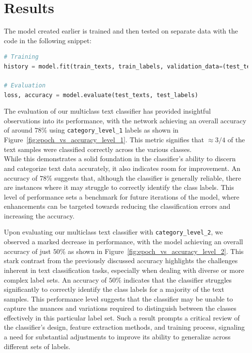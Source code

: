 \section{Results}
The model created earlier is trained and then tested on separate data with the code in the following snippet:
\begin{lstlisting}[language=Python]
# Training
history = model.fit(train_texts, train_labels, validation_data=(test_texts, test_labels), epochs=epochs, batch_size=batch_size, use_multiprocessing=True)

# Evaluation
loss, accuracy = model.evaluate(test_texts, test_labels)
\end{lstlisting}

The evaluation of our multiclass text classifier has provided insightful observations into its performance, with the network achieving an overall accuracy of around $78\%$ using \verb|category_level_1| labels as shown in Figure~\ref{fig:epoch_vs_accuracy_level_1}.
This metric signifies that $\approx 3/4$ of the text samples were classified correctly across the various classes.\\
While this demonstrates a solid foundation in the classifier's ability to discern and categorize text data accurately, it also indicates room for improvement.
An accuracy of $78\%$ suggests that, although the classifier is generally reliable, there are instances where it may struggle to correctly identify the class labels.
This level of performance sets a benchmark for future iterations of the model, where enhancements can be targeted towards reducing the classification errors and increasing the accuracy.

Upon evaluating our multiclass text classifier with \verb|category_level_2|, we observed a marked decrease in performance, with the model achieving an overall accuracy of just $50\%$ as shown in Figure~\ref{fig:epoch_vs_accuracy_level_2}. This stark contrast from the previously discussed accuracy highlights the challenges inherent in text classification tasks, especially when dealing with diverse or more complex label sets. An accuracy of $50\%$ indicates that the classifier struggles significantly to correctly identify the class labels for a majority of the text samples. This performance level suggests that the classifier may be unable to capture the nuances and variations required to distinguish between the classes effectively in this particular label set. Such a result prompts a critical review of the classifier’s design, feature extraction methods, and training process, signaling a need for substantial adjustments to improve its ability to generalize across different sets of labels.

